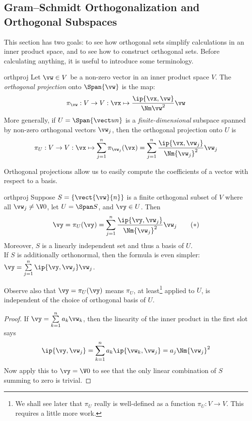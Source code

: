 \pagebreak[3]

\subsection{Gram--Schmidt Orthogonalization and Orthogonal Subspaces}

This section has two goals: to see how orthogonal sets simplify calculations in an inner product space, and to see how to construct orthogonal sets. Before calculating anything, it is useful to introduce some terminology.

\begin{defn}{}{orthproj}
Let $\vw\in V$ be a non-zero vector in an inner product space $V$. The \emph{orthogonal projection} onto $\Span\{\vw\}$ is the map:
\[\pi_\vw:V\to V: \vx\mapsto \frac{\ip{\vx,\vw}}{\Nm\vw^2}\vw\]
More generally, if $U=\Span\{\vect un\}$ is a \emph{finite-dimensional} subspace spanned by non-zero orthogonal vectors $\vw_j$, then the orthogonal projection onto $U$ is
\[\pi_U:V\to V: \vx\mapsto  \sum_{j=1}^n\pi_{\vw_j}(\vx)= \sum_{j=1}^n\frac{\ip{\vx,\vw_j}}{\Nm{\vw_j}^2}\vw_j\]
\end{defn}

Orthogonal projections allow us to easily compute the coefficients of a vector with respect to a basis. 

\begin{thm}{}{orthproj}
Suppose $S=\{\vect{\vw}{n}\}$ is a finite orthogonal subset of $V$ where all $\vw_j\neq\V0$, let $U=\Span S$, and $\vy\in U$. Then
\[\vy=\pi_U(\vy)=\sum_{j=1}^n\frac{\ip{\vy,\vw_j}}{\Nm{\vw_j}^2}\vw_j \tag{$\ast$}\]
Moreover, $S$ is a linearly independent set and thus a basis of $U$.\\
If $S$ is additionally orthonormal, then the formula is even simpler: $\vy=\sum\limits_{j=1}^n\ip{\vy,\vw_j}\vw_j$.
\end{thm}

Observe also that $\vy=\pi_U(\vy)$ means $\pi_U$, at least\footnote{We shall see later that $\pi_U$ really is well-defined as a function $\pi_U:V\to V$. This requires a little more work.} applied to $U$, is independent of the choice of orthogonal basis of $U$.


\begin{proof}
If $\vy=\sum\limits_{k=1}^na_k\vw_k$, then the linearity of the inner product in the first slot says
\[\ip{\vy,\vw_j}= \sum\limits_{k=1}^na_k\ip{\vw_k,\vw_j}= a_j\Nm{\vw_j}^2\]
Now apply this to $\vy=\V0$ to see that the only linear combination of $S$ summing to zero is trivial. 
\end{proof}

